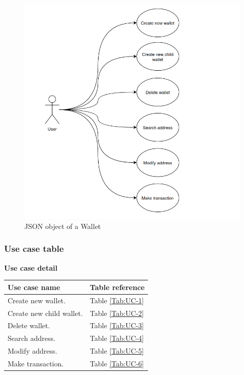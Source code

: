 \begin{figure}[ht!]
    \centering
    \includegraphics[width=1\textwidth]{images/usecases.png}
    \caption[General JSON object of a Wallet]{JSON object of a Wallet}
    \label{fig:usecases}
\end{figure}

\newpage
\subsubsection{Use case table}

\bigskip
{\textbf{Use case detail}}

\begin{table}[b]
    \begin{tabular}{| m{8cm} | m{6cm} |}
        \hline
        Use case name            & Table reference      \\ \hline
        Create new wallet.       & Table \ref{Tab:UC-1} \\ \hline
        Create new child wallet. & Table \ref{Tab:UC-2} \\ \hline
        Delete wallet.           & Table \ref{Tab:UC-3} \\ \hline
        Search address.          & Table \ref{Tab:UC-4} \\ \hline
        Modify address.          & Table \ref{Tab:UC-5} \\ \hline
        Make transaction.        & Table \ref{Tab:UC-6} \\ \hline
    \end{tabular}
\end{table}


